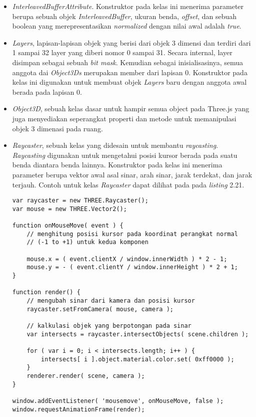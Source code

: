 \begin{itemize}
\begin{itemize}
	\item{\it InterleavedBufferAttribute}. Konstruktor pada kelas ini menerima parameter berupa sebuah objek {\it InterleavedBuffer}, ukuran benda, {\it offset}, dan sebuah boolean yang merepresentasikan {\it normalized} dengan nilai awal adalah {\it true}.
	
	\item{\it Layers}, lapisan-lapisan objek yang berisi dari objek 3 dimensi dan terdiri dari 1 sampai 32 layer yang diberi nomor 0 sampai 31. Secara internal, layer disimpan sebagai sebuah {\it bit mask}. Kemudian sebagai inisialisasinya, semua anggota dai {\it Object3Ds} merupakan member dari lapisan 0. Konstruktor pada kelas ini digunakan untuk membuat objek {\it Layers} baru dengan anggota awal berada pada lapisan 0.
	\item{\it Object3D}, sebuah kelas dasar untuk hampir semua object pada Three.js yang juga menyediakan seperangkat properti dan metode untuk memanipulasi objek 3 dimenasi pada ruang.
	\item{\it Raycaster}, sebuah kelas yang didesain untuk membantu {\it raycasting}. {\it Raycasting} digunakan untuk mengetahui posisi kursor berada pada suatu benda diantara benda lainnya. Konstruktor pada kelas ini menerima parameter berupa vektor awal asal sinar, arah sinar, jarak terdekat, dan jarak terjauh. Contoh untuk kelas {\it Raycaster} dapat dilihat pada pada {\it listing} 2.21.
	
\begin{lstlisting}[caption={Contoh penggunaan kelas {\it Raycaster}.},captionpos=b]
var raycaster = new THREE.Raycaster();
var mouse = new THREE.Vector2();

function onMouseMove( event ) {
	// menghitung posisi kursor pada koordinat perangkat normal
	// (-1 to +1) untuk kedua komponen

	mouse.x = ( event.clientX / window.innerWidth ) * 2 - 1;
	mouse.y = - ( event.clientY / window.innerHeight ) * 2 + 1;
}

function render() {
	// mengubah sinar dari kamera dan posisi kursor
	raycaster.setFromCamera( mouse, camera );

	// kalkulasi objek yang berpotongan pada sinar
	var intersects = raycaster.intersectObjects( scene.children );

	for ( var i = 0; i < intersects.length; i++ ) {
		intersects[ i ].object.material.color.set( 0xff0000 );
	}
	renderer.render( scene, camera );
}

window.addEventListener( 'mousemove', onMouseMove, false );
window.requestAnimationFrame(render);
\end{lstlisting}
	

\end{itemize}
\end{itemize}
